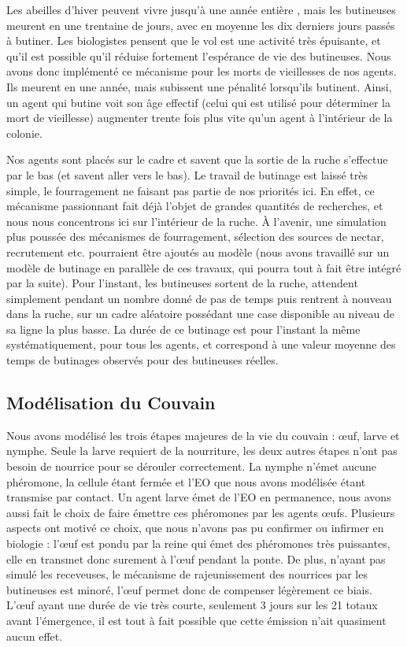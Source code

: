 		Les abeilles d'hiver peuvent vivre jusqu'à une année entière \cite{mattila_timing_2001}, mais les butineuses meurent en une trentaine de jours, avec en moyenne les dix derniers jours passés à butiner. Les biologistes pensent que le vol est une activité très épuisante, et qu'il est possible qu'il réduise fortement l'espérance de vie des butineuses. Nous avons donc implémenté ce mécanisme pour les morts de vieillesses de nos agents. Ils meurent en une année, mais subissent une pénalité lorsqu'ils butinent. Ainsi, un agent qui butine voit son âge effectif (celui qui est utilisé pour déterminer la mort de vieillesse) augmenter trente fois plus vite qu'un agent à l'intérieur de la colonie.
		
		Nos agents sont placés sur le cadre et savent que la sortie de la ruche s'effectue par le bas (et savent aller vers le bas). Le travail de butinage est laissé très simple, le fourragement ne faisant pas partie de nos priorités ici. En effet, ce mécanisme passionnant fait déjà l'objet de grandes quantités de recherches, et nous nous concentrons ici sur l'intérieur de la ruche. À l'avenir, une simulation plus poussée des mécanismes de fourragement, sélection des sources de nectar, recrutement etc. pourraient être ajoutés au modèle (nous avons travaillé sur un modèle de butinage \cite{bajo_toward_2018,riviere_modemulti-agent_2021} en parallèle de ces travaux, qui pourra tout à fait être intégré par la suite). Pour l'instant, les butineuses sortent de la ruche, attendent simplement pendant un nombre donné de pas de temps puis rentrent à nouveau dans la ruche, sur un cadre aléatoire possédant une case disponible au niveau de sa ligne la plus basse. La durée de ce butinage est pour l'instant la même systématiquement, pour tous les agents, et correspond à une valeur moyenne des temps de butinages observés pour des butineuses réelles.
		
		
		\subsection{Modélisation du Couvain}
		
			Nous avons modélisé les trois étapes majeures de la vie du couvain : œuf, larve et nymphe. Seule la larve requiert de la nourriture, les deux autres étapes n'ont pas besoin de nourrice pour se dérouler correctement. La nymphe n'émet aucune phéromone, la cellule étant fermée et l'EO que nous avons modélisée étant transmise par contact. Un agent larve émet de l'EO en permanence, nous avons aussi fait le choix de faire émettre ces phéromones par les agents œufs. Plusieurs aspects ont motivé ce choix, que nous n'avons pas pu confirmer ou infirmer en biologie : l'œuf est pondu par la reine qui émet des phéromones très puissantes, elle en transmet donc surement à l'œuf pendant la ponte. De plus, n'ayant pas simulé les receveuses, le mécanisme de rajeunissement des nourrices par les butineuses est minoré, l'œuf permet donc de compenser légèrement ce biais. L'œuf ayant une durée de vie très courte, seulement 3 jours sur les 21 totaux avant l'émergence, il est tout à fait possible que cette émission n'ait quasiment aucun effet.
			
